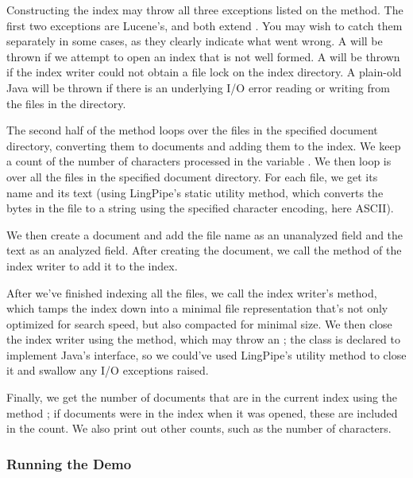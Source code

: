 Constructing the index may throw all three exceptions listed on the
 method.  The first two exceptions are Lucene's, and both
extend .  You may wish to catch them separately in
some cases, as they clearly indicate what went wrong. A
 will be thrown if we attempt to open an
index that is not well formed.  A 
will be thrown if the index writer could not obtain a file lock on the
index directory.  A plain-old Java  will be thrown
if there is an underlying I/O error reading or writing from the files
in the directory.

The second half of the  method loops over the files
in the specified document directory, converting them to documents
and adding them to the index.
%
%
We keep a count of the number of characters processed in the variable
.  We then loop is over all the files in the specified
document directory.  For each file, we get its name and its text
(using LingPipe's static  utility method, which
converts the bytes in the file to a string using the specified
character encoding, here ASCII).  

We then create a document and add the file name as an unanalyzed field
and the text as an analyzed field.  After creating the document, we
call the  method of the index writer to
add it to the index.

After we've finished indexing all the files, we call the index
writer's  method, which tamps the index down into a
minimal file representation that's not only optimized for search
speed, but also compacted for minimal size.  We then close the index
writer using the  method, which may throw an
; the  class is declared to
implement Java's  interface, so we could've used
LingPipe's  utility method to close it
and swallow any I/O exceptions raised.

Finally, we get the number of documents that are in the current index
using the method ; if documents were in the index when
it was opened, these are included in the count.  We also print out 
other counts, such as the number of characters.

\subsubsection{Running the Demo}

